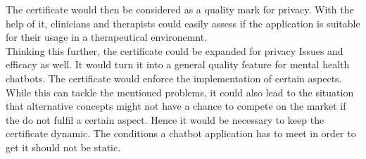 \documentclass[sigconf, nonacm]{acmart}
\begin{document}
The certificate would then be considered as a quality mark for privacy.
With the help of it, clinicians and therapists could easily assess if the application is suitable for their usage in a therapeutical environemnt.\\
Thinking this further, the certificate could be expanded for privacy Issues and efficacy as well. It would turn it into a general quality feature for mental health chatbots. The certificate would enforce the implementation of certain aspects. While this can tackle the mentioned problems, it could also lead to the situation
that alternative concepts might not have a chance to compete on the market if the do not fulfil a certain aspect. Hence it would be necessary to keep the certificate dynamic. The conditions a chatbot application has to meet in order to get it should not be static.
\end{document}
